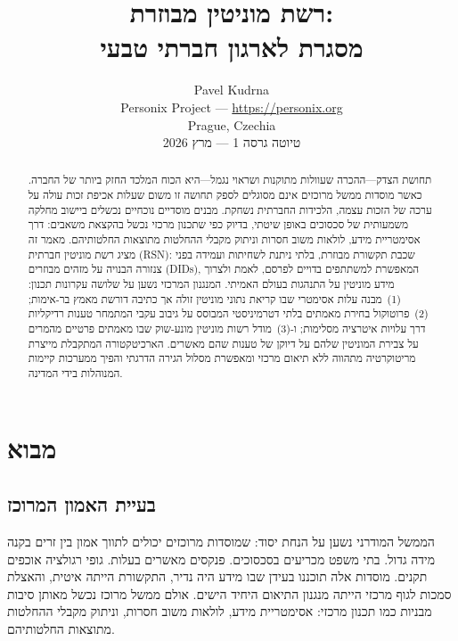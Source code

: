 \documentclass[11pt,a4paper,twocolumn]{article}
\title{\textbf{רשת מוניטין מבוזרת:\\מסגרת לארגון חברתי טבעי}}
\author{Pavel Kudrna\\Personix Project --- \url{https://personix.org}\\Prague, Czechia\\טיוטה גרסה 1 --- מרץ 2026}
\date{}
\begin{document}
\maketitle

\begin{abstract}
תחושת הצדק---ההכרה שעוולות מתוקנות ושראוי נגמל---היא הכוח המלכד החזק ביותר של החברה. כאשר מוסדות ממשל מרוכזים אינם מסוגלים לספק תחושה זו משום שעלות אכיפת זכות עולה על ערכה של הזכות עצמה, הלכידות החברתית נשחקת. מבנים מוסדיים נוכחיים נכשלים ביישוב מחלקה משמעותית של סכסוכים באופן שיטתי, בדיוק כפי שתכנון מרכזי נכשל בהקצאת משאבים: דרך אסימטריית מידע, לולאות משוב חסרות וניתוק מקבלי ההחלטות מתוצאות החלטותיהם. מאמר זה מציג רשת מוניטין חברתית (RSN): שכבת תקשורת מבוזרת, בלתי ניתנת לשחיתות ועמידה בפני צנזורה הבנויה על מזהים מבוזרים (DIDs), המאפשרת למשתתפים בדויים לפרסם, לאמת ולצרוך מידע מוניטין על התנהגות בעולם האמיתי. המנגנון המרכזי נשען על שלושה עקרונות תכנון: (1)~מבנה עלות אסימטרי שבו קריאת נתוני מוניטין זולה אך כתיבה דורשת מאמץ בר-אימות; (2)~פרוטוקול בחירת מאמתים בלתי דטרמיניסטי המבוסס על גיבוב עקבי המתמחר טענות רדיקליות דרך עלויות איטרציה מסלימות; ו-(3)~מודל רשות מוניטין מונע-שוק שבו מאמתים פרטיים מהמרים על צבירת המוניטין שלהם על דיוקן של טענות שהם מאשרים. הארכיטקטורה המתקבלת מייצרת מריטוקרטיה מתהווה ללא תיאום מרכזי ומאפשרת מסלול הגירה הדרגתי והפיך ממערכות קיימות המנוהלות בידי המדינה.
\end{abstract}

\section{מבוא}

\subsection{בעיית האמון המרוכז}

הממשל המודרני נשען על הנחת יסוד: שמוסדות מרוכזים יכולים לתווך אמון בין זרים בקנה מידה גדול. בתי משפט מכריעים בסכסוכים. פנקסים מאשרים בעלות. גופי רגולציה אוכפים תקנים. מוסדות אלה תוכננו בעידן שבו מידע היה נדיר, התקשורת הייתה איטית, והאצלת סמכות לגוף מרכזי הייתה מנגנון התיאום היחיד הישים. אולם ממשל מרוכז נכשל מאותן סיבות מבניות כמו תכנון מרכזי: אסימטריית מידע, לולאות משוב חסרות, וניתוק מקבלי ההחלטות מתוצאות החלטותיהם.
\end{document}
